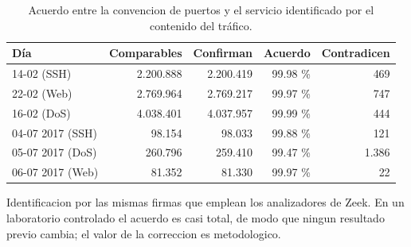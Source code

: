 \begin{table}[htbp]
  \centering
  \caption{Acuerdo entre la convencion de puertos y el servicio identificado por el contenido del tráfico.}
  \label{tab:servicio}
  \begin{tabular}{lrrrr}
    \toprule
    \textbf{Día} & \textbf{Comparables} & \textbf{Confirman} & \textbf{Acuerdo} & \textbf{Contradicen} \\
    \midrule
    14-02 (SSH) & 2.200.888 & 2.200.419 & 99.98 \% & 469 \\
    22-02 (Web) & 2.769.964 & 2.769.217 & 99.97 \% & 747 \\
    16-02 (DoS) & 4.038.401 & 4.037.957 & 99.99 \% & 444 \\
    04-07 2017 (SSH) & 98.154 & 98.033 & 99.88 \% & 121 \\
    05-07 2017 (DoS) & 260.796 & 259.410 & 99.47 \% & 1.386 \\
    06-07 2017 (Web) & 81.352 & 81.330 & 99.97 \% & 22 \\
    \bottomrule
  \end{tabular}
  \par\smallskip\footnotesize{Identificacion por las mismas firmas que emplean los analizadores de Zeek. En un laboratorio controlado el acuerdo es casi total, de modo que ningun resultado previo cambia; el valor de la correccion es metodologico.}
\end{table}
